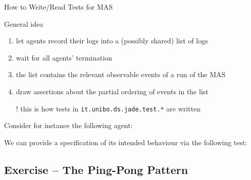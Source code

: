 \documentclass{beamer}\mode<presentation>{\usetheme{AMSCesenaPurpleAndGold}}
\begin{document}
\begin{frame}[c,allowframebreaks]{How to Write/Read Tests for MAS}
	
	\begin{block}{General idea}
		\begin{enumerate}
			\item let agents record their logs into a (possibly shared) \alert{list of logs}
			\item wait for all agents' termination
			\item the list contains the relevant \alert{observable events} of a run of the MAS
			\item draw assertions about the \alert{partial ordering} of events in the list
		\end{enumerate}
	\end{block}
	
	\bigskip
	
	\begin{itemize}
		\item[!] this is how tests in \texttt{it.unibo.ds.jade.\alert{test.*}} are written
	\end{itemize}

	\framebreak
	
	Consider for instance the following agent:
	
	
	\framebreak
	
	We can provide a specification of its intended behaviour via the following test:
	
	
\end{frame}

\startExercise

\subsection{Exercise \currentExercise{} -- The Ping-Pong Pattern}
\end{document}
